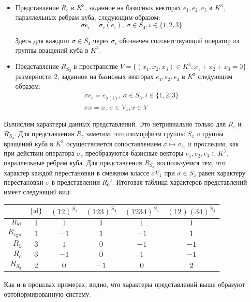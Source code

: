 \begin{solution}
\begin{itemize}
		\item Представление $R_c$ в $K^3$, заданное на базисных векторах $e_1, e_2, e_3$ в $K^3$, параллельных ребрам куба, следующим образом:
		\[\sigma e_i = \sigma_c(e_{i}),~\sigma \in S_4, i \in \{1, 2, 3\}\]
		
		Здесь для каждого $\sigma \in S_4$ через $\sigma_c$ обозначен соответствующий оператор из группы вращений куба в $K^3$.
		
		\item Представление $R_{S_3}$ в пространстве $V = \{(x_1, x_2, x_3) \in K^3 : x_1 + x_2 + x_3 = 0\}$ размерности $2$, заданное на базисных векторах $e_1, e_2, e_3$ в $K^3$ следующим образом:
		\begin{gather*}
			\sigma e_i = e_{\sigma(i)},~\sigma \in S_3, i \in \{1, 2, 3\}\\
			\sigma x = x,~\sigma \in V_4, x \in V
		\end{gather*}
	\end{itemize}

	Вычислим характеры данных представлений. Это нетривиально только для $R_c$ и $R_{S_3}$.  Для представления $R_c$ заметим, что изоморфизм группы $S_4$ и группы вращений куба в $K^3$ осуществляется сопоставлением $\sigma \mapsto \sigma_c$, и проследим, как при действии оператора $\sigma_c$ преобразуются базисные векторы $e_1, e_2, e_3 \in K^3$, параллельные ребрам куба. Для представления $R_{S_3}$ воспользуемся тем, что характер каждой перестановки в смежном классе $\sigma V_4$ при $\sigma \in S_3$ равен характеру перестановки $\sigma$ в представлении $R_0'$. Итоговая таблица характеров представлений имеет следующий вид:
	\begin{center}
		\begin{tabular}{r|c|c|c|c|c}
			& $\{\mathrm{id}\}$ & $(12)^{S_4}$ &  $(123)^{S_4}$ & $(1234)^{S_4}$ & $(12)(34)^{S_4}$ \\ \hline
			$R_{\mathrm{id}}$ &    $1$    &   $1$   &  $1$  &      $1$ & $1$     \\
			$R_{\mathrm{sgn}}$ &    $1$    &   $-1$   &  $1$  &      $-1$ & $1$     \\
			$R_0$ &    $3$    &      $1$      &      $0$      &       $-1$ &  $-1$ \\
			$R_c$ &    $3$    &      $-1$      &      $0$      &       $1$ & $-1$\\ 
			$R_{S_3}$ &    $2$    &      $0$      &      $-1$      &       $0$ & $2$\\
		\end{tabular}
	\end{center}
	
	Как и в прошлых примерах, видно, что характеры представлений выше образуют ортонормированную систему.
\end{solution}

